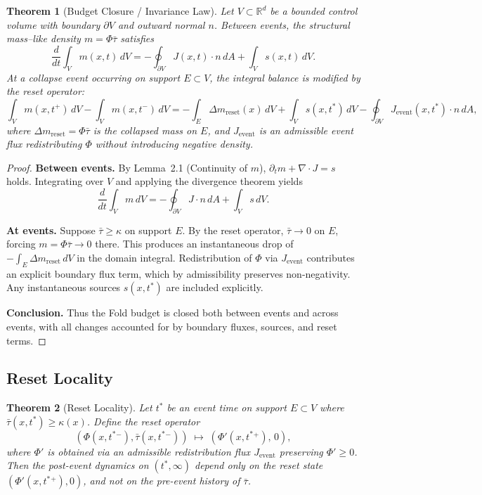 \documentclass[11pt]{article}
\newtheorem{theorem}{Theorem}[section]
\begin{document}
\begin{theorem}[Budget Closure / Invariance Law]
Let $V \subset \mathbb{R}^d$ be a bounded control volume with boundary $\partial V$ 
and outward normal $n$. Between events, the structural mass--like density 
$m=\Phi \bar{\tau}$ satisfies
\[
\frac{d}{dt} \int_V m(x,t)\, dV
= - \oint_{\partial V} J(x,t)\cdot n \, dA + \int_V s(x,t)\, dV.
\]
At a collapse event occurring on support $E \subset V$, the integral balance 
is modified by the reset operator:
\[
\int_V m(x,t^+)\, dV - \int_V m(x,t^-)\, dV
= - \int_E \Delta m_{\text{reset}}(x)\, dV 
+ \int_V s(x,t^\ast)\, dV
- \oint_{\partial V} J_{\text{event}}(x,t^\ast)\cdot n \, dA,
\]
where $\Delta m_{\text{reset}} = \Phi \bar{\tau}$ is the collapsed mass on $E$, and 
$J_{\text{event}}$ is an admissible event flux redistributing $\Phi$ without 
introducing negative density.
\end{theorem}

\begin{proof}
\textbf{Between events.}  
By Lemma~2.1 (Continuity of $m$), 
$\partial_t m + \nabla \cdot J = s$ holds. 
Integrating over $V$ and applying the divergence theorem yields
\[
\frac{d}{dt} \int_V m \, dV 
= - \oint_{\partial V} J \cdot n \, dA + \int_V s \, dV.
\]

\textbf{At events.}  
Suppose $\bar{\tau} \geq \kappa$ on support $E$. 
By the reset operator, $\bar{\tau}\to 0$ on $E$, forcing 
$m=\Phi \bar{\tau}\to 0$ there. 
This produces an instantaneous drop of 
$-\int_E \Delta m_{\text{reset}}\, dV$ in the domain integral. 
Redistribution of $\Phi$ via $J_{\text{event}}$ contributes an explicit boundary flux term, 
which by admissibility preserves non-negativity. 
Any instantaneous sources $s(x,t^\ast)$ are included explicitly.

\textbf{Conclusion.}  
Thus the Fold budget is closed both between events and across events, 
with all changes accounted for by boundary fluxes, sources, and reset terms. 
\end{proof}


\subsection{Reset Locality}

\begin{theorem}[Reset Locality]
Let $t^\ast$ be an event time on support $E \subset V$ where 
$\bar{\tau}(x,t^\ast) \geq \kappa(x)$. 
Define the reset operator
\[
(\Phi(x,t^\ast{}^-), \bar{\tau}(x,t^\ast{}^-)) 
\;\mapsto\; (\Phi'(x,t^\ast{}^+), \, 0),
\]
where $\Phi'$ is obtained via an admissible redistribution flux 
$J_{\text{event}}$ preserving $\Phi' \geq 0$. 
Then the post-event dynamics on $(t^\ast,\infty)$ depend only on the 
reset state $(\Phi'(x,t^\ast{}^+),0)$, and not on the pre-event history 
of $\bar{\tau}$.
\end{theorem}
\end{document}

